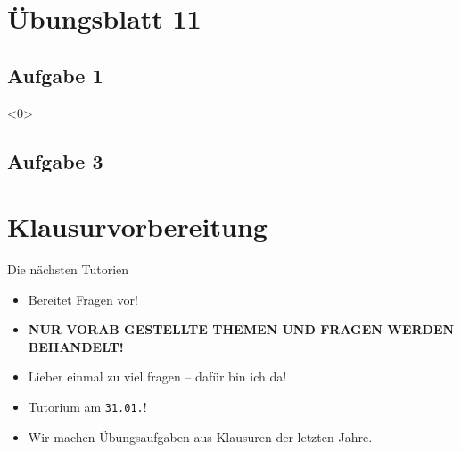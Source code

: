 \documentclass[aspectratio=169,usepdftitle=true,11pt,ngerman,t]{beamer}
\subtitle{Tutorium 12}
\date{17. Januar 2025}
\begin{document}

\section[Ringe und Verbundenheit -- Verlobung?]{Übungsblatt 11}

\subsection{Aufgabe 1}


\begin{frame}<0>
    \begin{solve}
    \end{solve}
\end{frame}

\subsection{Aufgabe 3}


\section[Das Finale rückt näher...]{Klausurvorbereitung}

\begin{frame}{Die nächsten Tutorien}\onslide<+->
    \begin{itemize}
        \item Bereitet Fragen vor!\hfill\href{https://pad.uni-muenster.de/s/Qr3ApAkCB}{}
        \item \textbf{NUR VORAB GESTELLTE THEMEN UND FRAGEN WERDEN BEHANDELT!}
        \item Lieber einmal zu viel fragen -- dafür bin ich da!
        \item<+-> Tutorium am \texttt{31.01.}!
        \item Wir machen Übungsaufgaben aus Klausuren der letzten Jahre.
    \end{itemize}
\end{frame}
\end{document}
